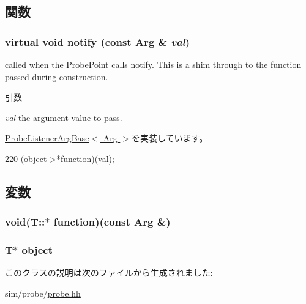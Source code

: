 \subsection{関数}
\hypertarget{classProbeListenerArg_a03fbf8d00c9fe34c7f9ec78f46c3f621}{
\subsubsection[{notify}]{\setlength{\rightskip}{0pt plus 5cm}virtual void notify (const Arg \& {\em val})}}
\label{classProbeListenerArg_a03fbf8d00c9fe34c7f9ec78f46c3f621}


called when the \hyperlink{classProbePoint}{ProbePoint} calls notify. This is a shim through to the function passed during construction. 
\begin{DoxyParams}{引数}
\item[{\em val}]the argument value to pass. \end{DoxyParams}


\hyperlink{classProbeListenerArgBase_ab47404eccdea3a95766588b12953baf5}{ProbeListenerArgBase$<$ Arg $>$}を実装しています。


\begin{DoxyCode}
220 { (object->*function)(val); }
\end{DoxyCode}


\subsection{変数}
\hypertarget{classProbeListenerArg_a7997c1131eac35b9de8d4e11b49ce2af}{
\subsubsection[{function}]{\setlength{\rightskip}{0pt plus 5cm}void(T::$\ast$  {\bf function})(const Arg \&)}}
\label{classProbeListenerArg_a7997c1131eac35b9de8d4e11b49ce2af}
\hypertarget{classProbeListenerArg_acd5a12b9b1a75e37fd605accfe038a03}{
\subsubsection[{object}]{\setlength{\rightskip}{0pt plus 5cm}T$\ast$ {\bf object}}}
\label{classProbeListenerArg_acd5a12b9b1a75e37fd605accfe038a03}


このクラスの説明は次のファイルから生成されました:\begin{DoxyCompactItemize}
\item 
sim/probe/\hyperlink{probe_8hh}{probe.hh}\end{DoxyCompactItemize}

